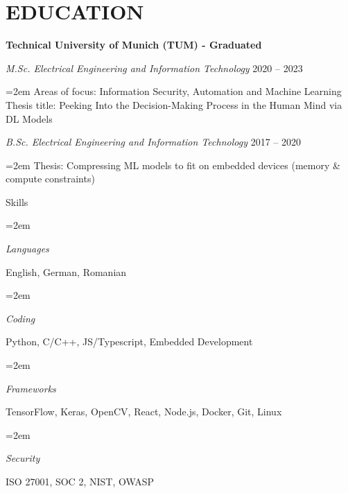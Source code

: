 \documentclass[paper=a4,fontsize=11pt]{scrartcl}
\newlength{\spacebox}
\newcommand{\sepspace}{\vspace*{0.35em}}		%
\newcommand{\NewPart}[1]{\section*{\uppercase{#1}}}
\newcommand{\PersonalEntry}[2]{
		\noindent\hangindent=2em\hangafter=0 %
		\parbox{\spacebox}{        %
		\textit{#1}}		       %
		\hspace{1.5em} #2 \par}    %
\newcommand{\SkillsEntry}[2]{      %
		\noindent\hangindent=2em\hangafter=0 %
		\parbox{\spacebox}{        %
		\textit{#1}}			   %
		\hspace{2.5em} #2 \par}    %
\newcommand{\EducationEntry}[4]{
		\noindent \textit{#1} \hfill      %
		\colorbox{custom_gray}{\color{white}#2} \par  %
		\noindent\hangindent=2em\hangafter=0 \small #3 %
		\normalsize \par}
\begin{document}
\NewPart{Education}{}
\textbf{Technical University of Munich (TUM) - Graduated}

\EducationEntry{M.Sc. Electrical Engineering and Information Technology}{2020 – 2023}{Areas of focus: Information Security, Automation and Machine Learning \\
Thesis title: Peeking Into the Decision-Making Process in the Human Mind via DL Models}
\sepspace

\EducationEntry{B.Sc. Electrical Engineering and Information Technology}{2017 – 2020} {Thesis: Compressing ML models to fit on embedded devices (memory \& compute constraints)}


\NewPart{Skills}{}

\SkillsEntry{Languages}{English, German, Romanian}
\SkillsEntry{Coding}{Python, \textsc{C/C++}, JS/Typescript, Embedded Development}
\SkillsEntry{Frameworks}{TensorFlow, Keras, OpenCV, React, Node.js, Docker, Git, Linux}
\SkillsEntry{Security}{ISO 27001, SOC 2, NIST, OWASP}


\end{document}
